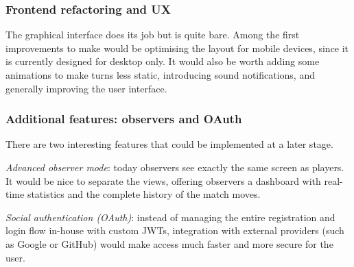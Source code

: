 \documentclass{scrartcl}
\begin{document}
\subsubsection*{Frontend refactoring and UX}

The graphical interface does its job but is quite bare.
Among the first improvements to make would be optimising the layout
for mobile devices, since it is currently designed for desktop only.
It would also be worth adding some animations to make turns less static,
introducing sound notifications, and generally improving the user interface.

\subsubsection*{Additional features: observers and OAuth}

There are two interesting features that could be implemented at a later stage.

\emph{Advanced observer mode}: today observers see exactly the same screen
as players. It would be nice to separate the views, offering observers
a dashboard with real-time statistics and the complete history of the match moves.

\emph{Social authentication (OAuth)}: instead of managing the entire
registration and login flow in-house with custom JWTs, integration with
external providers (such as Google or GitHub) would make access much faster
and more secure for the user.




\end{document}
